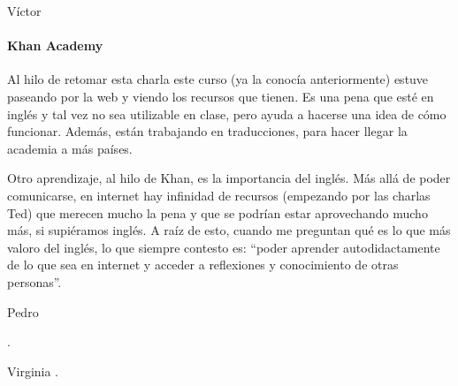 \begin{opin}{\victorcolor}{Víctor}
\paragraph{Khan Academy}

Al hilo de retomar esta charla este curso (ya la conocía anteriormente) estuve paseando por la web y viendo los recursos que tienen.
%
Es una pena que esté en inglés y tal vez no sea utilizable en clase, pero ayuda a hacerse una idea de cómo funcionar. 
%
Además, están trabajando en traducciones, para hacer llegar la academia a más países.

Otro aprendizaje, al hilo de Khan, es la importancia del inglés. 
%
Más allá de poder comunicarse, en internet hay infinidad de recursos (empezando por las charlas Ted) que merecen mucho la pena y que se podrían estar aprovechando mucho más, si supiéramos inglés.
%
A raíz de esto, cuando me preguntan qué es lo que más valoro del inglés, lo que siempre contesto es: ``poder aprender autodidactamente de lo que sea en internet y acceder a reflexiones y conocimiento de otras personas''.


\end{opin}

\begin{opin}{\pedrocolor}{Pedro}

.


\end{opin}

\begin{opin}{\virgicolor}{Virginia}
.


\end{opin}
